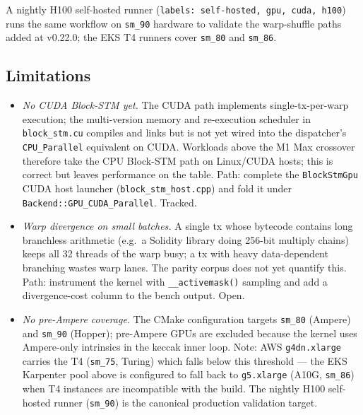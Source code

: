 A nightly H100 self-hosted runner (\texttt{labels: self-hosted, gpu, cuda,
h100}) runs the same workflow on \texttt{sm\_90} hardware to validate the
warp-shuffle paths added at v0.22.0; the EKS T4 runners cover \texttt{sm\_80}
and \texttt{sm\_86}.

\subsection{Limitations}

\begin{itemize}
  \item \emph{No CUDA Block-STM yet.} The CUDA path implements
    single-tx-per-warp execution; the multi-version memory and
    re-execution scheduler in \texttt{block\_stm.cu} compiles and links
    but is not yet wired into the dispatcher's \texttt{CPU\_Parallel}
    equivalent on CUDA. Workloads above the M1 Max crossover therefore
    take the CPU Block-STM path on Linux/CUDA hosts; this is correct but
    leaves performance on the table. Path: complete the
    \texttt{BlockStmGpu} CUDA host launcher
    (\texttt{block\_stm\_host.cpp}) and fold it under
    \texttt{Backend::GPU\_CUDA\_Parallel}. Tracked.
  \item \emph{Warp divergence on small batches.} A single tx whose
    bytecode contains long branchless arithmetic (e.g.\ a Solidity
    library doing 256-bit multiply chains) keeps all 32 threads of the
    warp busy; a tx with heavy data-dependent branching wastes warp
    lanes. The parity corpus does not yet quantify this. Path:
    instrument the kernel with \texttt{\_\_activemask()} sampling and
    add a divergence-cost column to the bench output. Open.
  \item \emph{No pre-Ampere coverage.} The CMake configuration targets
    \texttt{sm\_80} (Ampere) and \texttt{sm\_90} (Hopper); pre-Ampere
    GPUs are excluded because the kernel uses Ampere-only intrinsics in
    the keccak inner loop. Note: AWS \texttt{g4dn.xlarge} carries the T4
    (\texttt{sm\_75}, Turing) which falls below this threshold --- the
    EKS Karpenter pool above is configured to fall back to
    \texttt{g5.xlarge} (A10G, \texttt{sm\_86}) when T4 instances are
    incompatible with the build. The nightly H100 self-hosted runner
    (\texttt{sm\_90}) is the canonical production validation target.
\end{itemize}

